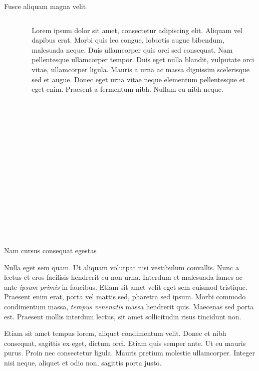 \documentclass[final]{beamer}
\newlength{\colwidth}
\begin{document}
\begin{frame}[t]
\begin{columns}[t]
\begin{column}{\colwidth}
\begin{block}{Fusce aliquam magna velit}
\vspace{1em}

\begin{columns}
\begin{column}{0.4\textwidth}
\begin{center}
      \begin{figure}
      \caption{Another figure caption.}
    \end{figure}
   \end{center}
\end{column}
\begin{column}{0.6\textwidth}  %
\justify
Lorem ipsum dolor sit amet, consectetur adipiscing elit. Aliquam vel dapibus erat. Morbi quis leo congue, lobortis augue bibendum, malesuada neque. Duis ullamcorper quis orci sed consequat. Nam pellentesque ullamcorper tempor. Duis eget nulla blandit, vulputate orci vitae, ullamcorper ligula. Mauris a urna ac massa dignissim scelerisque sed et augue. Donec eget urna vitae neque elementum pellentesque et eget enim. Praesent a fermentum nibh. Nullam eu nibh neque. 
\end{column}
\end{columns}


  \end{block}

  \begin{block}{Nam cursus consequat egestas}

    Nulla eget sem quam. Ut aliquam volutpat nisi vestibulum convallis. Nunc a
    lectus et eros facilisis hendrerit eu non urna. Interdum et malesuada fames
    ac ante \textit{ipsum primis} in faucibus. Etiam sit amet velit eget sem
    euismod tristique. Praesent enim erat, porta vel mattis sed, pharetra sed
    ipsum. Morbi commodo condimentum massa, \textit{tempus venenatis} massa
    hendrerit quis. Maecenas sed porta est. Praesent mollis interdum lectus,
    sit amet sollicitudin risus tincidunt non.

    Etiam sit amet tempus lorem, aliquet condimentum velit. Donec et nibh
    consequat, sagittis ex eget, dictum orci. Etiam quis semper ante. Ut eu
    mauris purus. Proin nec consectetur ligula. Mauris pretium molestie
    ullamcorper. Integer nisi neque, aliquet et odio non, sagittis porta justo.


\end{block}
\end{column}
\end{columns}
\end{frame}
\end{document}

